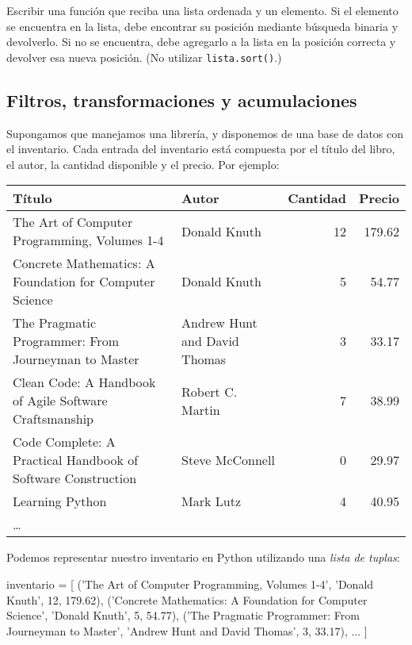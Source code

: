 \begin{ejercicio}
Escribir una función que reciba una lista ordenada y un elemento. Si el
elemento se encuentra en la lista, debe encontrar su posición mediante
búsqueda binaria y devolverlo.  Si no se encuentra, debe agregarlo a la
lista en la posición correcta y devolver esa nueva posición. (No utilizar
\verb!lista.sort()!.)
\end{ejercicio}


\newpage
\begin{subappendices}
\section{Filtros, transformaciones y acumulaciones}

Supongamos que manejamos una librería, y disponemos de una base de datos con el
inventario. Cada entrada del inventario está compuesta por el título del libro,
el autor, la cantidad disponible y el precio. Por ejemplo:

\begin{center}
\begin{tabular}{p{8cm} p{3cm} r r}
{\bf Título} & {\bf Autor} & {\bf Cantidad} & {\bf Precio} \\
\hline
The Art of Computer Programming, Volumes 1-4 & Donald Knuth & 12 & 179.62 \\ \hline
Concrete Mathematics: A Foundation for Computer Science & Donald Knuth & 5 & 54.77 \\ \hline
The Pragmatic Programmer: From Journeyman to Master & Andrew Hunt and David Thomas & 3 & 33.17 \\ \hline
Clean Code: A Handbook of Agile Software Craftsmanship & Robert C. Martin & 7 & 38.99 \\ \hline
Code Complete: A Practical Handbook of Software Construction & Steve McConnell & 0 & 29.97 \\ \hline
Learning Python & Mark Lutz & 4 & 40.95 \\ \hline
\ldots \\ \hline
\end{tabular}
\end{center}

Podemos representar nuestro inventario en Python utilizando una \emph{lista de
tuplas}:

\begin{codigo-python-sn}
inventario = [
    ('The Art of Computer Programming, Volumes 1-4',
     'Donald Knuth', 12, 179.62),
    ('Concrete Mathematics: A Foundation for Computer Science',
     'Donald Knuth', 5, 54.77),
    ('The Pragmatic Programmer: From Journeyman to Master',
     'Andrew Hunt and David Thomas', 3, 33.17),
    ...
]
\end{codigo-python-sn}


\end{subappendices}
